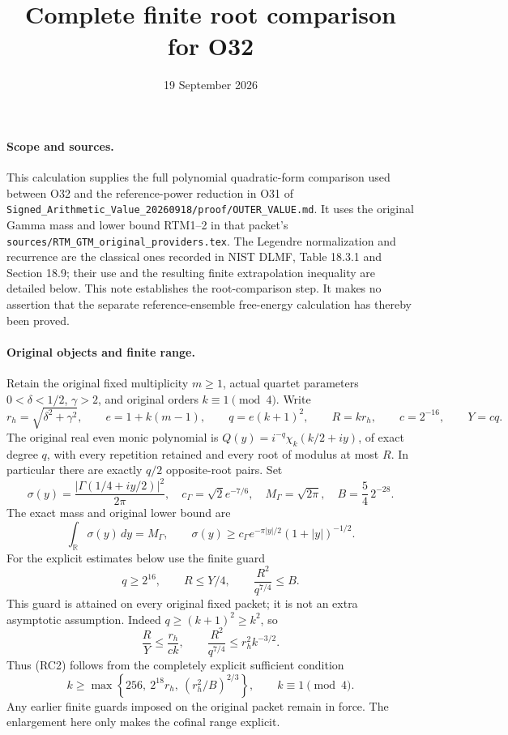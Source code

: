 \documentclass[11pt]{article}
\begin{document}
\title{Complete finite root comparison for O32}
\author{}
\date{19 September 2026}
\maketitle

\paragraph{Scope and sources.}
This calculation supplies the full polynomial quadratic-form comparison
used between O32 and the reference-power reduction in O31 of
\texttt{Signed\_Arithmetic\_Value\_20260918/proof/OUTER\_VALUE.md}.
It uses the original Gamma mass and lower bound RTM1--2 in that packet's
\texttt{sources/RTM\_GTM\_original\_providers.tex}.
The Legendre normalization and recurrence are the classical ones recorded
in NIST DLMF, Table 18.3.1 and Section 18.9; their use and the resulting
finite extrapolation inequality are detailed below.
This note establishes the root-comparison step. It makes no assertion
that the separate reference-ensemble free-energy calculation has thereby
been proved.

\paragraph{Original objects and finite range.}
Retain the original fixed multiplicity $m\geq1$, actual quartet parameters
$0<\delta<1/2$, $\gamma>2$, and original orders $k\equiv1\pmod4$.
Write
\[
 r_h=\sqrt{\delta^2+\gamma^2},\qquad
 e=1+k(m-1),\qquad q=e(k+1)^2,\qquad R=kr_h,\qquad
 c=2^{-16},\qquad Y=cq.
\]
The original real even monic polynomial is
$Q(y)=i^{-q}\chi_k(k/2+iy)$, of exact degree $q$, with every
repetition retained and every root of modulus at most $R$.
In particular there are exactly $q/2$ opposite-root pairs.
Set
\[
 \sigma(y)=\frac{|\Gamma(1/4+iy/2)|^2}{2\pi},\quad
 c_\Gamma=\sqrt2 e^{-7/6},\quad M_\Gamma=\sqrt{2\pi},\quad
 B=\frac54\,2^{-28}.
\]
The exact mass and original lower bound are
\[
 \int_{\mathbb R}\sigma(y)\,dy=M_\Gamma,\qquad
 \sigma(y)\geq c_\Gamma e^{-\pi|y|/2}(1+|y|)^{-1/2}.
 \tag{RC1}
\]
For the explicit estimates below use the finite guard
\[
 q\geq2^{16},\qquad R\leq Y/4,\qquad
 \frac{R^2}{q^{7/4}}\leq B.                         \tag{RC2}
\]
This guard is attained on every original fixed packet; it is not an
extra asymptotic assumption. Indeed $q\geq(k+1)^2\geq k^2$, so
\[
 \frac RY\leq\frac{r_h}{ck},\qquad
 \frac{R^2}{q^{7/4}}\leq r_h^2 k^{-3/2}.
\]
Thus (RC2) follows from the completely explicit sufficient condition
\[
 k\geq
 \max\left\{256,\ 2^{18}r_h,\
                 (r_h^2/B)^{2/3}\right\},
 \qquad k\equiv1\pmod4.                           \tag{RC3}
\]
Any earlier finite guards imposed on the original packet remain in force.
The enlargement here only makes the cofinal range explicit.
\end{document}
